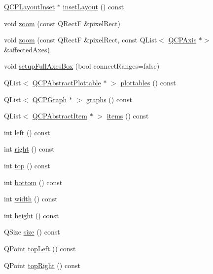 \begin{DoxyCompactItemize}
\item 
\hyperlink{class_q_c_p_layout_inset}{Q\+C\+P\+Layout\+Inset} $\ast$ \hyperlink{class_q_c_p_axis_rect_a949f803466619924c7018df4b511ae10}{inset\+Layout} () const
\item 
void \hyperlink{class_q_c_p_axis_rect_a5fc8460564e81dcc2a9343dc8bc1fe67}{zoom} (const Q\+RectF \&pixel\+Rect)
\item 
void \hyperlink{class_q_c_p_axis_rect_a6a39fb3aea60a8c503bdcb3f0477d2f6}{zoom} (const Q\+RectF \&pixel\+Rect, const Q\+List$<$ \hyperlink{class_q_c_p_axis}{Q\+C\+P\+Axis} $\ast$$>$ \&affected\+Axes)
\item 
void \hyperlink{class_q_c_p_axis_rect_a5fa906175447b14206954f77fc7f1ef4}{setup\+Full\+Axes\+Box} (bool connect\+Ranges=false)
\item 
Q\+List$<$ \hyperlink{class_q_c_p_abstract_plottable}{Q\+C\+P\+Abstract\+Plottable} $\ast$ $>$ \hyperlink{class_q_c_p_axis_rect_a587d073a97b27bc7293fab4b2774ad59}{plottables} () const
\item 
Q\+List$<$ \hyperlink{class_q_c_p_graph}{Q\+C\+P\+Graph} $\ast$ $>$ \hyperlink{class_q_c_p_axis_rect_a2d9ded3eca97be1fcb5867949391bb88}{graphs} () const
\item 
Q\+List$<$ \hyperlink{class_q_c_p_abstract_item}{Q\+C\+P\+Abstract\+Item} $\ast$ $>$ \hyperlink{class_q_c_p_axis_rect_a03c113a2175448300ee8f944e24776ba}{items} () const
\item 
int \hyperlink{class_q_c_p_axis_rect_afb4a3de02046b20b9310bdb8fca781c3}{left} () const
\item 
int \hyperlink{class_q_c_p_axis_rect_a3f819d4a1b2193723d1fdafc573eea10}{right} () const
\item 
int \hyperlink{class_q_c_p_axis_rect_a45dbad181cbb9f09d068dbb76c817c95}{top} () const
\item 
int \hyperlink{class_q_c_p_axis_rect_acefdf1abaa8a8ab681e906cc2be9581e}{bottom} () const
\item 
int \hyperlink{class_q_c_p_axis_rect_a204645398a4f9d0b0189385c7c2cfb91}{width} () const
\item 
int \hyperlink{class_q_c_p_axis_rect_acc4377809e79d9a089ab790f39429b0d}{height} () const
\item 
Q\+Size \hyperlink{class_q_c_p_axis_rect_a7a8289346eb612f422c704f8b75cf479}{size} () const
\item 
Q\+Point \hyperlink{class_q_c_p_axis_rect_a5a847b3ddeca3abec38d3838fefb0dbd}{top\+Left} () const
\item 
Q\+Point \hyperlink{class_q_c_p_axis_rect_a7aa221967549ba71b98c465bf8234758}{top\+Right} () const
$$
\end{DoxyCompactItemize}
